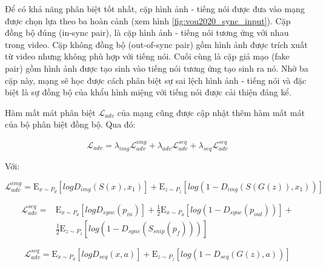 Để có khả năng phân biệt tốt nhất, cặp hình ảnh - tiếng nói được đưa vào mạng được chọn lựa theo ba hoàn cảnh (xem hình \ref{fig:vou2020_sync_input}). Cặp đồng bộ đúng (in-sync pair), là cặp hình ảnh - tiếng nói tương ứng với nhau trong video. Cặp không đồng bộ (out-of-sync pair) gồm hình ảnh được trích xuất từ video nhưng không phù hợp với tiếng nói. Cuối cùng là cặp giả mạo (fake pair) gồm hình ảnh được tạo sinh vào tiếng nói tương ứng tạo sinh ra nó. Nhờ ba cặp này, mạng sẽ học được cách phân biệt sự sai lệch hình ảnh - tiếng nói và đặc biệt là sự đồng bộ của khẩu hình miệng với tiếng nói được cải thiện đáng kể.

Hàm mất mát phân biệt $\mathcal{L}_{adv}$ của mạng cũng được cập nhật thêm hàm mất mát của bộ phân biệt đồng bộ. Qua đó:

\begin{equation}
    \mathcal{L}_{adv} = \lambda_{img}\mathcal{L}^{img}_{adv} + \lambda_{adv}\mathcal{L}^{seq}_{adv} + \lambda_{seq}\mathcal{L}^{seq}_{adv}
    \label{eqn:vou2020_adv_loss}
\end{equation}

Với:

\begin{equation}
    \mathcal{L}^{img}_{adv} = \mathrm{E}_{x\sim P_d}[logD_{img}(S(x),x_1)] + \mathrm{E}_{z\sim P_z}[log(1 - D_{img}(S(G(z)), x_1))]
    \label{eqn:vou2020_img_loss}
\end{equation}

\begin{equation}
    \begin{split}
    \mathcal{L}^{seq}_{adv} = &\mathrm{E}_{x\sim P_d}[logD_{sync}(p_{in})] + \frac{1}{2}\mathrm{E}_{x\sim P_d}[log(1 - D_{sync}(p_{out}))] + \\
    &\frac{1}{2}\mathrm{E}_{z\sim P_z}[log(1 - D_{sync}(S_{snip}(p_{\textit{f}})))]
    \end{split}
    \label{eqn:vou2020_sync_loss}
\end{equation}

\begin{equation}
    \mathcal{L}^{seq}_{adv} = \mathrm{E}_{x\sim P_d}[logD_{seq}(x,a)] + \mathrm{E}_{z\sim P_z}[log(1 - D_{seq}(G(z), a))]
    \label{eqn:vou2020_seq_loss}
\end{equation}
